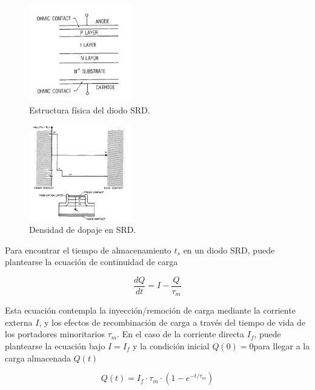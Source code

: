 \begin{figure}[t]
  \centering
    \includegraphics[width=0.4\textwidth]{images/srd_diode_structure.jpg}
    \caption{Estructura física del diodo SRD.}
    \label{fig:srd_diode_structure}
\end{figure}

\begin{figure}[t]
  \centering
    \includegraphics[width=0.4\textwidth]{images/srd_impurity_profile.jpg}
    \caption{Densidad de dopaje en SRD.}
    \label{fig:srd_impurity_profile}
\end{figure}

Para encontrar el tiempo de almacenamiento $t_s$ en un diodo SRD, puede
plantearse la ecuación de continuidad de carga \cite{moll1962} \cite{moll1969}

\begin{equation}
    \frac{dQ}{dt} = I-\frac{Q}{\tau_m}
\end{equation}

Esta ecuación contempla la inyección/remoción de carga mediante la corriente
externa $I$, y los efectos de recombinación de carga a través del tiempo de vida
de los portadores minoritarios $\tau_m$. En el caso de la corriente directa
$I_f$, puede plantearse la ecuación bajo $I=I_f$ y la condición inicial $Q(0)=0$para llegar a la carga almacenada $Q(t)$

\begin{equation}
    Q(t) = I_f \cdot \tau_m \cdot \left( 1-e^{-t/\tau_m}\right)
\end{equation}


